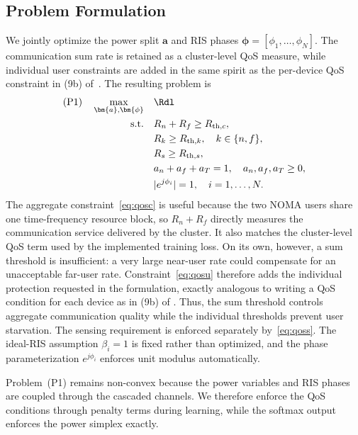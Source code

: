 \subsection{Problem Formulation}\label{sec:prob}
We jointly optimize the power split $\bm{a}$ and RIS phases
$\bm{\phi}=[\phi_1,\ldots,\phi_N]$. The communication sum rate is retained as a
cluster-level QoS measure, while individual user constraints are added in the
same spirit as the per-device QoS constraint in (9b) of~\cite{zou2023ml}. The
resulting problem is
\begin{subequations}\label{eq:prob}
\begin{align}
\text{(P1)}\quad \max_{\bm{a},\bm{\phi}}\quad & \Rdl \label{eq:obj}\\
\text{s.t.}\quad
& R_n+R_f\geq R_{\mathrm{th},c}, \label{eq:qosc}\\
& R_k\geq R_{\mathrm{th},k},\quad k\in\{n,f\}, \label{eq:qosu}\\
& R_s\geq R_{\mathrm{th},s}, \label{eq:qoss}\\
& a_n+a_f+a_T=1,\quad a_n,a_f,a_T\geq0, \label{eq:simplex}\\
& |e^{j\phi_i}|=1,\quad i=1,\ldots,N. \label{eq:unit}
\end{align}
\end{subequations}
The aggregate constraint~\eqref{eq:qosc} is useful because the two NOMA users
share one time-frequency resource block, so $R_n+R_f$ directly measures the
communication service delivered by the cluster. It also matches the
cluster-level QoS term used by the implemented training loss. On its own,
however, a sum threshold is insufficient: a very large near-user rate could
compensate for an unacceptable far-user rate. Constraint~\eqref{eq:qosu}
therefore adds the individual protection requested in the formulation, exactly
analogous to writing a QoS condition for each device as in (9b) of
\cite{zou2023ml}. Thus, the sum threshold controls aggregate communication
quality while the individual thresholds prevent user starvation. The sensing
requirement is enforced separately by~\eqref{eq:qoss}. The ideal-RIS assumption
$\beta_i=1$ is fixed rather than optimized, and the phase parameterization
$e^{j\phi_i}$ enforces unit modulus automatically.

Problem~(P1) remains non-convex because the power variables and RIS phases are
coupled through the cascaded channels. We therefore enforce the QoS conditions
through penalty terms during learning, while the softmax output enforces the
power simplex exactly.

